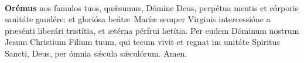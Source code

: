 \\[2mm]
\textbf{Orémus}
 nos famulos tuos, qu{\'\ae}sumus, Dómine Deus, perpétua mentis et córporis sanitáte gaudére: et gloriósa beát{\ae}\ Marí{\ae} semper Virginis intercessióne
a pr{\ae}sénti liberári tristítia, et {\ae}térna pérfrui l{\ae}títia. Per eudem Dóminum nostrum Jesum Christium Filium tuum, qui tecum vivit et regnat im unitáte Spiritus Sancti,
Deus, per ómnia s{\'\ae}cula s{\'\ae}culórum. Amen.